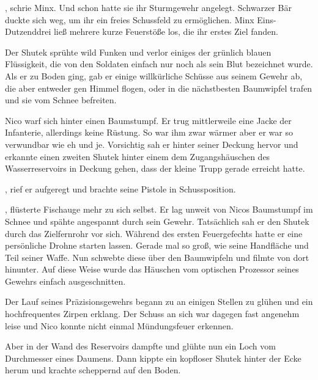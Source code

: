 , schrie Minx. Und schon hatte sie ihr Sturmgewehr angelegt. Schwarzer Bär duckte sich weg, um ihr ein freies Schussfeld zu ermöglichen. Minx Eins-Dutzenddrei ließ mehrere kurze Feuerstöße los, die ihr erstes Ziel fanden.

\par

Der Shutek sprühte wild Funken und verlor einiges der grünlich blauen Flüssigkeit, die von den Soldaten einfach nur noch als sein Blut bezeichnet wurde. Als er zu Boden ging, gab er einige willkürliche Schüsse aus seinem Gewehr ab, die aber entweder gen Himmel flogen, oder in die nächstbesten Baumwipfel trafen und sie vom Schnee befreiten.

\par

Nico warf sich hinter einen Baumstumpf. Er trug mittlerweile eine Jacke der Infanterie, allerdings keine Rüstung. So war ihm zwar wärmer aber er war so verwundbar wie eh und je. Vorsichtig sah er hinter seiner Deckung hervor und erkannte einen zweiten Shutek hinter einem dem Zugangshäuschen des Wasserreservoirs in Deckung gehen, dass der kleine Trupp gerade erreicht hatte.

\par

, rief er aufgeregt und brachte seine Pistole in Schussposition.

\par

, flüsterte Fischauge mehr zu sich selbst. Er lag unweit von Nicos Baumstumpf im Schnee und spähte angespannt durch sein Gewehr. Tatsächlich sah er den Shutek durch das Zielfernrohr vor sich. Während des ersten Feuergefechts hatte er eine persönliche Drohne starten lassen. Gerade mal so groß, wie seine Handfläche und Teil seiner Waffe. Nun schwebte diese über den Baumwipfeln und filmte von dort hinunter. Auf diese Weise wurde das Häuschen vom optischen Prozessor seines Gewehrs einfach ausgeschnitten.

\par

Der Lauf seines Präzisionsgewehrs begann zu an einigen Stellen zu glühen und ein hochfrequentes Zirpen erklang. Der Schuss an sich war dagegen fast angenehm leise und Nico konnte nicht einmal Mündungsfeuer erkennen.

\par

Aber in der Wand des Reservoirs dampfte und glühte nun ein Loch vom Durchmesser eines Daumens. Dann kippte ein kopfloser Shutek hinter der Ecke herum und krachte scheppernd auf den Boden.

